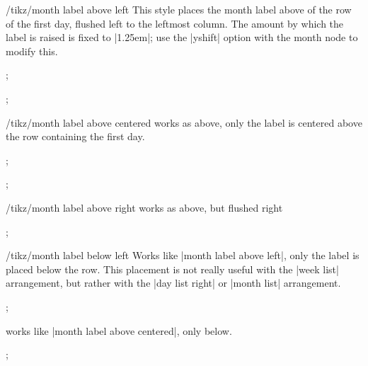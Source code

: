 \begin{stylekey}{/tikz/month label above left}
  This style places the month label above of the row of the first day,
  flushed left to the leftmost column. The amount by which the label
  is raised is fixed to |1.25em|; use the |yshift| option with the
  month node to modify this.
\begin{codeexample}[]
\tikz
  \calendar [dates=2000-01-28 to 2000-02-03,
             day list right,month xshift=1em,
             month label above left];
\end{codeexample}
\begin{codeexample}[]
\tikz
  \calendar [dates=2000-01-20 to 2000-02-10,
             week list,month label above left];
\end{codeexample}
\end{stylekey}

\begin{stylekey}{/tikz/month label above centered}
  works as above, only the label is centered above the row containing
  the first day.
\begin{codeexample}[]
\tikz
  \calendar [dates=2000-02-01 to 2000-02-last,
             day list right,month label above centered];
\end{codeexample}
\begin{codeexample}[]
\tikz
  \calendar [dates=2000-01-20 to 2000-02-10,
             week list,month label above centered];
\end{codeexample}
\end{stylekey}

\begin{stylekey}{/tikz/month label above right}
  works as above, but flushed right
\begin{codeexample}[]
\tikz
  \calendar [dates=2000-01-20 to 2000-02-10,
             week list,month label above right];
\end{codeexample}
\end{stylekey}

\begin{stylekey}{/tikz/month label below left}
  Works like |month label above left|, only the label is placed below
  the row. This placement is not really useful with the |week list|
  arrangement, but rather with the |day list right| or |month list|
  arrangement.
\begin{codeexample}[]
\tikz
  \calendar [dates=2000-02-01 to 2000-02-last,
             day list right,month label below left];
\end{codeexample}
  works like |month label above centered|, only below.
\begin{codeexample}[]
\tikz
  \calendar [dates=2000-02-01 to 2000-02-last,
             day list right,month label below centered];
\end{codeexample}
\end{stylekey}



